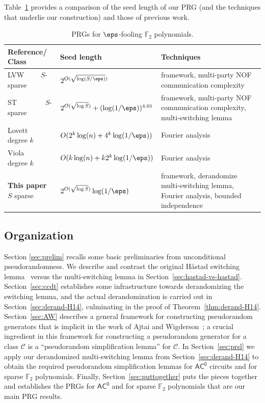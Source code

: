 \documentclass{toc}
\theoremstyle{plain}
\newcommand{\acz}{\mathsf{AC^0}}
\renewcommand{\F}{\mathds{F}}
\begin{document}
Table~\ref{table:F2} provides a comparison of the seed length of our PRG (and the techniques that underlie our construction) and those of previous work. 


\begin{table}[h]
\renewcommand{\arraystretch}{1.6}
\centering
\begin{tabular}{|m{6em}|m{11.5em}|m{21em}|}
\hline
 Reference/ Class&  Seed length & Techniques \\ \hline
\cite{LVW93} LVW $\text{~~~~~}$ $S$-sparse & $2^{O(\sqrt{\log(S/\eps)})}$ & \cite{NW94} framework, \cite{BNS92} multi-party NOF communication complexity\\ 
\hline
\cite{ST18} ST $\text{~~~~~~~~~~}$ $S$-sparse & $2^{O(\sqrt{\log S})} + (\log(1/\eps))^{4.01}$  & \cite{NW94} framework, \cite{BNS92} multi-party NOF communication complexity, \cite{Has14} multi-switching lemma\\ 
\hline
\cite{Lov09} Lovett $\text{~~~~~}$ degree $k$ & $O(2^k \log(n) + 4^{k} \log(1/\eps))$ & Fourier analysis \\ \hline 
\cite{Vio09} Viola $\text{~~~~~~}$ degree $k$ & $O(k\log(n) + k2^{k}\log(1/\eps))$  & Fourier analysis \\ \hline  \hline
%
{\bf This paper}   %
\text{~~} $S$ sparse & $2^{O(\sqrt{\log S})}  \log(1/\eps)$ & \cite{AjtaiWigderson:85} framework, derandomize~\cite{Has14} multi-switching lemma,
Fourier analysis, bounded independence\\ \hline
 \end{tabular}
 \caption{PRGs for $\eps$-fooling $\F_2$ polynomials.}
 \label{table:F2}
 \end{table}

%
%

\subsection{Organization}
Section \ref{sec:prelim} recalls some basic preliminaries from unconditional pseudorandomness.
We describe and contrast the original H{\aa}stad switching lemma~\cite{Hastad86} versus the \cite{Has14} multi-switching lemma in Section~\ref{sec:hastad-vs-hastad}.
Section~\ref{sec:ccdt} establishes some infrastructure towards derandomizing the \cite{Has14} switching lemma, and the actual derandomization is carried out in Section~\ref{sec:derand-H14}, culminating in the proof of Theorem~\ref{thm:derand-H14}.
Section~\ref{sec:AW} describes a general framework for constructing pseudorandom generators that is implicit in the work of Ajtai and Wigderson~\cite{AjtaiWigderson:85}; a crucial ingredient in this framework for constructing a pseudorandom generator for a class $\mathscr{C}$ is a ``pseudorandom simplification lemma'' for $\mathscr{C}.$  In Section~\ref{sec:prsl} we apply our derandomized multi-switching lemma from Section~\ref{sec:derand-H14} to obtain the required pseudorandom simplification lemmas for $\acz$ circuits and for sparse $\F_2$ polynomials.  Finally, Section~\ref{sec:puttogether} puts the pieces together and establishes the PRGs for $\acz$ and for sparse $\F_2$ polynomials that are our main PRG results.
\end{document}
